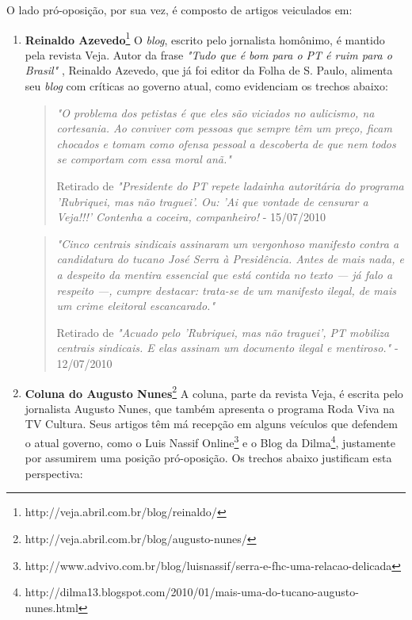 O lado pró-oposição, por sua vez, é composto de artigos veiculados em:

\begin{enumerate}

\item \textbf{Reinaldo Azevedo}\footnote{http://veja.abril.com.br/blog/reinaldo/} O \emph{blog}, escrito pelo jornalista homônimo, é mantido pela revista Veja. Autor da frase \emph{"Tudo que é bom para o PT é ruim para o Brasil"} \cite{bom-pt-mau-brasil}, Reinaldo Azevedo, que já foi editor da Folha de S. Paulo, alimenta seu \emph{blog} com críticas ao governo atual, como evidenciam os trechos abaixo:

\begin{quote}

\emph{"O problema dos petistas é que eles são viciados no aulicismo, na cortesania. Ao conviver com pessoas que sempre têm um preço, ficam chocados e tomam como ofensa pessoal a descoberta de que nem todos se comportam com essa moral anã."}

{\small Retirado de \emph{"Presidente do PT repete ladainha autoritária do programa 'Rubriquei, mas não traguei'. Ou: 'Ai que vontade de censurar a Veja!!!' Contenha a coceira, companheiro!} - 15/07/2010} 
\end{quote}

\begin{quote}

\emph{"Cinco centrais sindicais assinaram um vergonhoso manifesto contra a candidatura do tucano José Serra à Presidência. Antes de mais nada, e a despeito da mentira essencial que está contida no texto — já falo a respeito —, cumpre destacar: trata-se de um manifesto ilegal, de mais um crime eleitoral escancarado."}

{\small Retirado de \emph{"Acuado pelo 'Rubriquei, mas não traguei', PT mobiliza centrais sindicais. E elas assinam um documento ilegal e mentiroso."} - 12/07/2010 }

\end{quote}

\item \textbf{Coluna do Augusto Nunes}\footnote{http://veja.abril.com.br/blog/augusto-nunes/} A coluna, parte da revista Veja, é escrita pelo jornalista Augusto Nunes, que também apresenta o programa Roda Viva na TV Cultura. Seus artigos têm má recepção em alguns veículos que defendem o atual governo, como o Luis Nassif Online\footnote{http://www.advivo.com.br/blog/luisnassif/serra-e-fhc-uma-relacao-delicada} e o Blog da Dilma\footnote{http://dilma13.blogspot.com/2010/01/mais-uma-do-tucano-augusto-nunes.html}, justamente por assumirem uma posição pró-oposição. Os trechos abaixo justificam esta perspectiva:



\end{enumerate}
